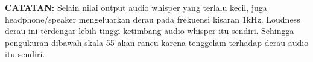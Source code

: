 \documentclass[12pt,]{article}
\begin{document}
	\textbf{CATATAN:}
	Selain nilai output audio whisper yang terlalu kecil,
	juga headphone/speaker mengeluarkan derau pada frekuensi kisaran 1kHz.
	Loudness derau ini terdengar lebih tinggi ketimbang audio whisper itu sendiri.
	Sehingga pengukuran dibawah skala 55 akan rancu karena tenggelam terhadap derau audio itu sendiri.
\end{document}
